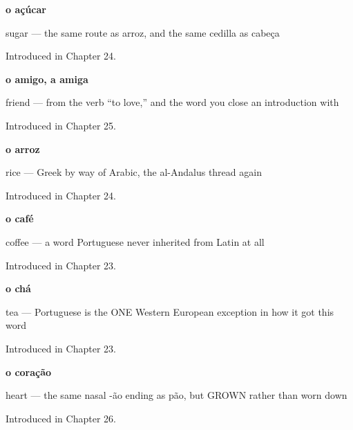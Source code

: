 \noindent\begin{minipage}[t]{\linewidth}
\raggedright
\textbf{o açúcar}\par
\small sugar — the same route as arroz, and the same cedilla as cabeça\par
\footnotesize Introduced in Chapter 24.
\end{minipage}\par\medskip

\noindent\begin{minipage}[t]{\linewidth}
\raggedright
\textbf{o amigo, a amiga}\par
\small friend — from the verb \textquotedblleft{}to love,\textquotedblright{} and the word you close an introduction with\par
\footnotesize Introduced in Chapter 25.
\end{minipage}\par\medskip

\noindent\begin{minipage}[t]{\linewidth}
\raggedright
\textbf{o arroz}\par
\small rice — Greek by way of Arabic, the al-Andalus thread again\par
\footnotesize Introduced in Chapter 24.
\end{minipage}\par\medskip

\noindent\begin{minipage}[t]{\linewidth}
\raggedright
\textbf{o café}\par
\small coffee — a word Portuguese never inherited from Latin at all\par
\footnotesize Introduced in Chapter 23.
\end{minipage}\par\medskip

\noindent\begin{minipage}[t]{\linewidth}
\raggedright
\textbf{o chá}\par
\small tea — Portuguese is the ONE Western European exception in how it got this word\par
\footnotesize Introduced in Chapter 23.
\end{minipage}\par\medskip

\noindent\begin{minipage}[t]{\linewidth}
\raggedright
\textbf{o coração}\par
\small heart — the same nasal -ão ending as pão, but GROWN rather than worn down\par
\footnotesize Introduced in Chapter 26.
\end{minipage}\par\medskip

